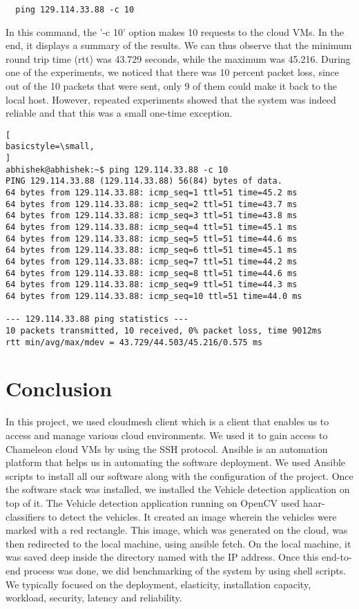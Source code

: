 \documentclass[9pt,twocolumn,twoside]{../../styles/osajnl}
\begin{document}
\begin{lstlisting}
  ping 129.114.33.88 -c 10
\end{lstlisting}
	
In this command, the '-c 10' option makes 10 requests to the cloud
VMs.  In the end, it displays a summary of the results.  We can thus
observe that the minimum round trip time (rtt) was 43.729 seconds,
while the maximum was 45.216.  During one of the experiments, we noticed
that there was 10 percent packet loss, since out of the 10 packets
that were sent, only 9 of them could make it back to the local host.
However, repeated experiments showed that the system was indeed
reliable and that this was a small one-time exception.  

\begin{lstlisting}[
basicstyle=\small,
]
abhishek@abhishek:~$ ping 129.114.33.88 -c 10
PING 129.114.33.88 (129.114.33.88) 56(84) bytes of data.
64 bytes from 129.114.33.88: icmp_seq=1 ttl=51 time=45.2 ms
64 bytes from 129.114.33.88: icmp_seq=2 ttl=51 time=43.7 ms
64 bytes from 129.114.33.88: icmp_seq=3 ttl=51 time=43.8 ms
64 bytes from 129.114.33.88: icmp_seq=4 ttl=51 time=45.1 ms
64 bytes from 129.114.33.88: icmp_seq=5 ttl=51 time=44.6 ms
64 bytes from 129.114.33.88: icmp_seq=6 ttl=51 time=45.1 ms
64 bytes from 129.114.33.88: icmp_seq=7 ttl=51 time=44.2 ms
64 bytes from 129.114.33.88: icmp_seq=8 ttl=51 time=44.6 ms
64 bytes from 129.114.33.88: icmp_seq=9 ttl=51 time=44.3 ms
64 bytes from 129.114.33.88: icmp_seq=10 ttl=51 time=44.0 ms

--- 129.114.33.88 ping statistics ---
10 packets transmitted, 10 received, 0% packet loss, time 9012ms
rtt min/avg/max/mdev = 43.729/44.503/45.216/0.575 ms
\end{lstlisting}


\section{Conclusion}
In this project, we used cloudmesh client which is a client that
enables us to access and manage various cloud environments.  We used
it to gain access to Chameleon cloud VMs by using the SSH protocol.
Ansible is an automation platform that helps us in automating the
software deployment.  We used Ansible scripts to install all our
software along with the configuration of the project.  Once the
software stack was installed, we installed the Vehicle detection
application on top of it.  The Vehicle detection application running
on OpenCV used haar-classifiers to detect the vehicles.  It created an image wherein the vehicles were marked with a red rectangle.  This image, which was generated on the cloud, was then redirected to the local machine, using ansible fetch.  On the local machine, it was saved deep inside the directory named with the IP address.  Once this end-to-end process was
done, we did benchmarking of the system by using shell scripts.  We typically focused on the
deployment, elasticity, installation capacity, workload, security,
latency and reliability.
\end{document}
